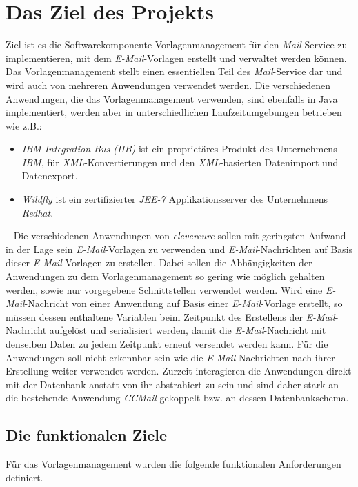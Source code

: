 \chapter{Das Ziel des Projekts}
\label{cha:Zielsetzung}
Ziel ist es die Softwarekomponente Vorlagenmanagement für den \emph{Mail}-Service zu implementieren, mit dem \emph{E-Mail}-Vorlagen erstellt und verwaltet werden können. Das Vorlagenmanagement stellt einen essentiellen Teil des \emph{Mail}-Service dar und wird auch von mehreren Anwendungen verwendet werden. Die verschiedenen Anwendungen, die das Vorlagenmanagement verwenden, sind ebenfalls in Java implementiert, werden aber in unterschiedlichen Laufzeitumgebungen betrieben wie z.B.:
\begin{itemize}
	\item\emph{IBM-Integration-Bus (IIB)}
	\newline
	ist ein proprietäres Produkt des Unternehmens \emph{IBM}, für \emph{XML}-Konvertierungen und den \emph{XML}-basierten Datenimport und Datenexport.
	\item\emph{Wildfly}
	\newline
	ist ein zertifizierter \emph{JEE-7} Applikationsserver des Unternehmens \emph{Redhat}.
\end{itemize} 
\ \newline
Die verschiedenen Anwendungen von \emph{clevercure} sollen mit geringsten Aufwand in der Lage sein \emph{E-Mail}-Vorlagen zu verwenden und \emph{E-Mail}-Nachrichten auf Basis dieser \emph{E-Mail}-Vorlagen zu erstellen. Dabei sollen die Abhängigkeiten der Anwendungen zu dem Vorlagenmanagement so gering wie möglich gehalten werden, sowie nur vorgegebene Schnittstellen verwendet werden. Wird eine \emph{E-Mail}-Nachricht von einer Anwendung auf Basis einer \emph{E-Mail}-Vorlage erstellt, so müssen dessen enthaltene Variablen beim Zeitpunkt des Erstellens der \emph{E-Mail}-Nachricht aufgelöst und serialisiert werden, damit die \emph{E-Mail}-Nachricht mit denselben Daten zu jedem Zeitpunkt erneut versendet werden kann. Für die Anwendungen soll nicht erkennbar sein wie die \emph{E-Mail}-Nachrichten nach ihrer Erstellung weiter verwendet werden. Zurzeit interagieren die Anwendungen direkt mit der Datenbank anstatt von ihr abstrahiert zu sein und sind daher stark an die bestehende Anwendung \emph{CCMail} gekoppelt bzw. an dessen Datenbankschema.
\newpage

\section{Die funktionalen Ziele}
Für das Vorlagenmanagement wurden die folgende funktionalen Anforderungen definiert.


